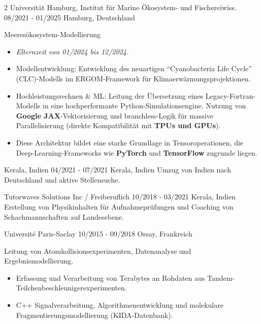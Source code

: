 \documentclass{thejus_cv}
\begin{document}
\begin{paracol}{2}
             {Universit\"at Hamburg, Institut f\"ur Marine \"Okosystem- und Fischereiwiss.}
             {08/2021 - 01/2025}
             {Hamburg, Deutschland}
             {Meeresökosystem-Modellierung
             \begin{itemize}
                 \item \textit{Elternzeit von 01/2024 bis 12/2024.}
                 \item Modellentwicklung: Entwicklung des neuartigen ``Cyanobacteria Life Cycle'' (CLC)-Modells im ERGOM-Framework f\"ur Klimaerw\"armungsprojektionen.
                 \item Hochleistungsrechnen \& ML: Leitung der \"Ubersetzung eines Legacy-Fortran-Modells in eine hochperformante Python-Simulationsengine. Nutzung von \textbf{Google JAX}-Vektorisierung und branchless-Logik f\"ur massive Parallelisierung (direkte Kompatibilit\"at mit \textbf{TPUs und GPUs}).
                 \item Diese Architektur bildet eine starke Grundlage in Tensoroperationen, die Deep-Learning-Frameworks wie \textbf{PyTorch} und \textbf{TensorFlow} zugrunde liegen.
             \end{itemize}}

             {Kerala, Indien}
             {04/2021 - 07/2021}
             {Kerala, Indien}
             {Umzug von Indien nach Deutschland und aktive Stellensuche.}

             {Tutorwaves Solutions Inc / Freiberuflich}
             {10/2018 - 03/2021}
             {Kerala, Indien}
             {Erstellung von Physikinhalten f\"ur Aufnahmepr\"ufungen und Coaching von Schachmannschaften auf Landesebene.}

             {Universit\'e Paris-Saclay}
             {10/2015 - 09/2018}
             {Orsay, Frankreich}
             {Leitung von Atomkollisionsexperimenten, Datenanalyse und Ergebnismodellierung.
             \begin{itemize}
                 \item Erfassung und Verarbeitung von Terabytes an Rohdaten aus Tandem-Teilchenbeschleunigerexperimenten.
                 \item C++ Signalverarbeitung, Algorithmenentwicklung und molekulare Fragmentierungsmodellierung (KIDA-Datenbank).
             \end{itemize}}



\end{paracol}
\end{document}
